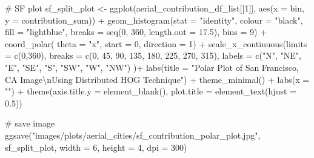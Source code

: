 \documentclass[
  letterpaper,
  DIV=11,
  numbers=noendperiod]{scrreprt}
\newenvironment{Shaded}{\begin{snugshade}}{\end{snugshade}}
\newcommand{\AttributeTok}[1]{\textcolor[rgb]{0.40,0.45,0.13}{#1}}
\newcommand{\CommentTok}[1]{\textcolor[rgb]{0.37,0.37,0.37}{#1}}
\newcommand{\DecValTok}[1]{\textcolor[rgb]{0.68,0.00,0.00}{#1}}
\newcommand{\FloatTok}[1]{\textcolor[rgb]{0.68,0.00,0.00}{#1}}
\newcommand{\FunctionTok}[1]{\textcolor[rgb]{0.28,0.35,0.67}{#1}}
\newcommand{\NormalTok}[1]{\textcolor[rgb]{0.00,0.23,0.31}{#1}}
\newcommand{\OtherTok}[1]{\textcolor[rgb]{0.00,0.23,0.31}{#1}}
\newcommand{\SpecialCharTok}[1]{\textcolor[rgb]{0.37,0.37,0.37}{#1}}
\newcommand{\StringTok}[1]{\textcolor[rgb]{0.13,0.47,0.30}{#1}}
\begin{document}
\begin{Shaded}
\begin{Highlighting}[]
\CommentTok{\# SF plot}
\NormalTok{sf\_split\_plot }\OtherTok{\textless{}{-}}
  \FunctionTok{ggplot}\NormalTok{(aerial\_contribution\_df\_list[[}\DecValTok{1}\NormalTok{]], }
         \FunctionTok{aes}\NormalTok{(}\AttributeTok{x =}\NormalTok{ bin, }\AttributeTok{y =}\NormalTok{ contribution\_sum)) }\SpecialCharTok{+}
  \FunctionTok{geom\_histogram}\NormalTok{(}\AttributeTok{stat =} \StringTok{"identity"}\NormalTok{,}
                 \AttributeTok{colour =} \StringTok{"black"}\NormalTok{, }
                 \AttributeTok{fill =} \StringTok{"lightblue"}\NormalTok{, }
                 \AttributeTok{breaks =} \FunctionTok{seq}\NormalTok{(}\DecValTok{0}\NormalTok{, }\DecValTok{360}\NormalTok{, }\AttributeTok{length.out =} \FloatTok{17.5}\NormalTok{),}
                 \AttributeTok{bins =} \DecValTok{9}\NormalTok{) }\SpecialCharTok{+}
  \FunctionTok{coord\_polar}\NormalTok{(}
    \AttributeTok{theta =} \StringTok{"x"}\NormalTok{, }
    \AttributeTok{start =} \DecValTok{0}\NormalTok{, }
    \AttributeTok{direction =} \DecValTok{1}\NormalTok{) }\SpecialCharTok{+}
  \FunctionTok{scale\_x\_continuous}\NormalTok{(}\AttributeTok{limits =} \FunctionTok{c}\NormalTok{(}\DecValTok{0}\NormalTok{,}\DecValTok{360}\NormalTok{),}
    \AttributeTok{breaks =} \FunctionTok{c}\NormalTok{(}\DecValTok{0}\NormalTok{, }\DecValTok{45}\NormalTok{, }\DecValTok{90}\NormalTok{, }\DecValTok{135}\NormalTok{, }\DecValTok{180}\NormalTok{, }\DecValTok{225}\NormalTok{, }\DecValTok{270}\NormalTok{, }\DecValTok{315}\NormalTok{), }
    \AttributeTok{labels =} \FunctionTok{c}\NormalTok{(}\StringTok{"N"}\NormalTok{, }\StringTok{"NE"}\NormalTok{, }\StringTok{"E"}\NormalTok{, }\StringTok{"SE"}\NormalTok{, }\StringTok{"S"}\NormalTok{, }\StringTok{"SW"}\NormalTok{, }\StringTok{"W"}\NormalTok{, }\StringTok{"NW"}\NormalTok{)}
\NormalTok{  )}\SpecialCharTok{+}
  \FunctionTok{labs}\NormalTok{(}\AttributeTok{title =} \StringTok{"Polar Plot of San Francisco, CA Image}\SpecialCharTok{\textbackslash{}n}\StringTok{Using Distributed HOG Technique"}\NormalTok{) }\SpecialCharTok{+}
  \FunctionTok{theme\_minimal}\NormalTok{() }\SpecialCharTok{+}
  \FunctionTok{labs}\NormalTok{(}\AttributeTok{x =} \StringTok{""}\NormalTok{) }\SpecialCharTok{+}
  \FunctionTok{theme}\NormalTok{(}\AttributeTok{axis.title.y =} \FunctionTok{element\_blank}\NormalTok{(),}
        \AttributeTok{plot.title =} \FunctionTok{element\_text}\NormalTok{(}\AttributeTok{hjust =} \FloatTok{0.5}\NormalTok{))}

\CommentTok{\# save image}
\FunctionTok{ggsave}\NormalTok{(}\StringTok{"images/plots/aerial\_cities/sf\_contribution\_polar\_plot.jpg"}\NormalTok{, sf\_split\_plot, }\AttributeTok{width =} \DecValTok{6}\NormalTok{, }\AttributeTok{height =} \DecValTok{4}\NormalTok{, }\AttributeTok{dpi =} \DecValTok{300}\NormalTok{)}
\end{Highlighting}
\end{Shaded}
\end{document}
